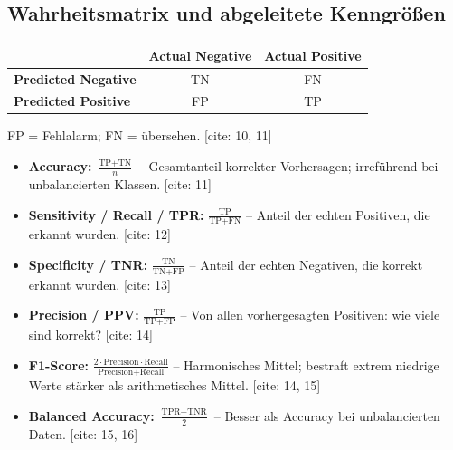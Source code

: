 \newpage

\subsection{Wahrheitsmatrix und abgeleitete Kenngrößen}


\begin{center}
\small
\begin{tabular}{|l|c|c|}
    \hline
    & \textbf{Actual Negative} & \textbf{Actual Positive} \\
    \hline
    \textbf{Predicted Negative} & TN & FN \\
    \hline
    \textbf{Predicted Positive} & FP & TP \\
    \hline
\end{tabular}
\end{center}

FP = Fehlalarm; FN = übersehen. [cite: 10, 11]

\begin{itemize}[leftmargin=1.5em]
    \item \textbf{Accuracy:} $\frac{\text{TP}+\text{TN}}{n}$ -- Gesamtanteil korrekter Vorhersagen; irreführend bei unbalancierten Klassen. [cite: 11]
    \item \textbf{Sensitivity / Recall / TPR:} $\frac{\text{TP}}{\text{TP}+\text{FN}}$ -- Anteil der echten Positiven, die erkannt wurden. [cite: 12]
    \item \textbf{Specificity / TNR:} $\frac{\text{TN}}{\text{TN}+\text{FP}}$ -- Anteil der echten Negativen, die korrekt erkannt wurden. [cite: 13]
    \item \textbf{Precision / PPV:} $\frac{\text{TP}}{\text{TP}+\text{FP}}$ -- Von allen vorhergesagten Positiven: wie viele sind korrekt? [cite: 14]
    \item \textbf{F1-Score:} $\frac{2\cdot\text{Precision}\cdot\text{Recall}}{\text{Precision}+\text{Recall}}$ -- Harmonisches Mittel; bestraft extrem niedrige Werte stärker als arithmetisches Mittel. [cite: 14, 15]
    \item \textbf{Balanced Accuracy:} $\frac{\text{TPR}+\text{TNR}}{2}$ -- Besser als Accuracy bei unbalancierten Daten. [cite: 15, 16]
\end{itemize}

